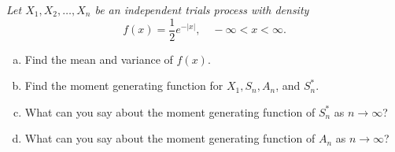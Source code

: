 \documentclass[12pt]{article}
\begin{document}
	{\em Let $X_1, X_2, \ldots, X_n$ be an independent trials process with density
	\begin{equation*}
		f(x) = \frac{1}{2}e^{-|x|}, \quad -\infty < x < \infty.
	\end{equation*} \setlength{\parskip}{0cm}
	\begin{enumerate}[a)]
		\item Find the mean and variance of $f(x)$.
		\item Find the moment generating function for $X_1, S_n, A_n$, and $S_n^*$.
		\item What can you say about the moment generating function of $S_n^*$ as $n \rightarrow \infty$?
		\item What can you say about the moment generating function of $A_n$ as $n \rightarrow \infty$?
	\end{enumerate}
	}
	
	


\end{document}
